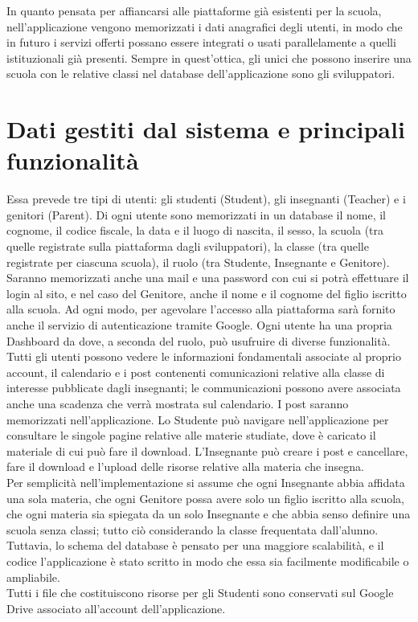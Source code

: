 \documentclass[Lau, binding=0.6cm, oneside]{sapthesis}
\begin{document}
In quanto pensata per affiancarsi alle piattaforme già esistenti per la scuola, nell'applicazione vengono memorizzati i dati anagrafici degli utenti, in modo che in futuro i servizi offerti possano essere integrati o usati parallelamente a quelli istituzionali già presenti. Sempre in quest'ottica, gli unici che possono inserire una scuola con le relative classi nel database dell'applicazione sono gli sviluppatori.\\

\section{Dati gestiti dal sistema e principali funzionalità} \label{requisiti_db}

Essa prevede tre tipi di utenti: gli studenti (Student), gli insegnanti (Teacher) e i genitori (Parent). Di ogni utente sono memorizzati in un database il nome, il cognome, il codice fiscale, la data e il luogo di nascita, il sesso, la scuola (tra quelle registrate sulla piattaforma dagli sviluppatori), la classe (tra quelle registrate per ciascuna scuola), il ruolo (tra Studente, Insegnante e Genitore). Saranno memorizzati anche una mail e una password con cui si potrà effettuare il login al sito, e nel caso del Genitore, anche il nome e il cognome del figlio iscritto alla scuola. Ad ogni modo, per agevolare l’accesso alla piattaforma sarà fornito anche il servizio di autenticazione tramite Google. Ogni utente ha una propria Dashboard da dove, a seconda del ruolo, può usufruire di diverse funzionalità. Tutti gli utenti possono vedere le informazioni fondamentali associate al proprio account, il calendario e i post contenenti comunicazioni relative alla classe di interesse pubblicate dagli insegnanti; le communicazioni possono avere associata anche una scadenza che verrà mostrata sul calendario. I post saranno memorizzati nell’applicazione. Lo Studente può navigare nell’applicazione per consultare le singole pagine relative alle materie studiate, dove è caricato il materiale di cui può fare il download. L’Insegnante può creare i post e cancellare, fare il download e l’upload delle risorse relative alla materia che insegna.\\
Per semplicità nell’implementazione si assume che ogni Insegnante abbia affidata una sola materia, che ogni Genitore possa avere solo un figlio iscritto alla scuola, che ogni materia sia spiegata da un solo Insegnante e che abbia senso definire una scuola senza classi; tutto ciò considerando la classe frequentata dall’alunno. Tuttavia, lo schema del database è pensato per una maggiore scalabilità, e il codice l'applicazione è stato scritto in modo che essa sia facilmente modificabile o ampliabile. \\
Tutti i file che costituiscono risorse per gli Studenti sono conservati sul Google Drive associato all’account dell’applicazione.\\
\end{document}
